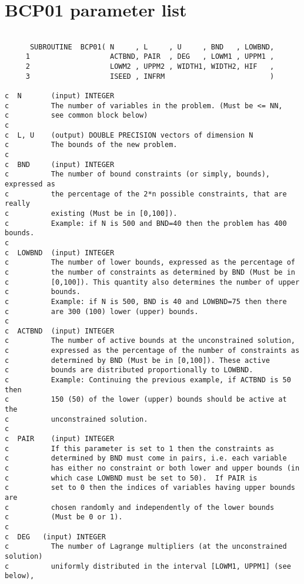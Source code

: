 \section{BCP01 parameter list\label{parameters}}
\begin{verbatim}

      SUBROUTINE  BCP01( N     , L     , U     , BND   , LOWBND,
     1                   ACTBND, PAIR  , DEG   , LOWM1 , UPPM1 ,
     2                   LOWM2 , UPPM2 , WIDTH1, WIDTH2, HIF   ,
     3                   ISEED , INFRM                         )

c  N       (input) INTEGER                 
c          The number of variables in the problem. (Must be <= NN, 
c          see common block below)
c
c  L, U    (output) DOUBLE PRECISION vectors of dimension N
c          The bounds of the new problem. 
c
c  BND     (input) INTEGER
c          The number of bound constraints (or simply, bounds), expressed as 
c          the percentage of the 2*n possible constraints, that are really 
c          existing (Must be in [0,100]). 
c          Example: if N is 500 and BND=40 then the problem has 400 bounds.
c
c  LOWBND  (input) INTEGER
c          The number of lower bounds, expressed as the percentage of 
c          the number of constraints as determined by BND (Must be in 
c          [0,100]). This quantity also determines the number of upper 
c          bounds.
c          Example: if N is 500, BND is 40 and LOWBND=75 then there 
c          are 300 (100) lower (upper) bounds.
c
c  ACTBND  (input) INTEGER
c          The number of active bounds at the unconstrained solution, 
c          expressed as the percentage of the number of constraints as 
c          determined by BND (Must be in [0,100]). These active 
c          bounds are distributed proportionally to LOWBND.
c          Example: Continuing the previous example, if ACTBND is 50 then 
c          150 (50) of the lower (upper) bounds should be active at the 
c          unconstrained solution.
c
c  PAIR    (input) INTEGER
c          If this parameter is set to 1 then the constraints as 
c          determined by BND must come in pairs, i.e. each variable 
c          has either no constraint or both lower and upper bounds (in 
c          which case LOWBND must be set to 50).  If PAIR is 
c          set to 0 then the indices of variables having upper bounds are 
c          chosen randomly and independently of the lower bounds
c          (Must be 0 or 1).
c
c  DEG   (input) INTEGER
c          The number of Lagrange multipliers (at the unconstrained solution)
c          uniformly distributed in the interval [LOWM1, UPPM1] (see below), 

\end{verbatim}
